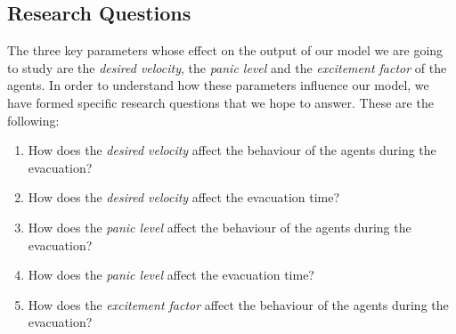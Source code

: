 \subsection{Research Questions}
The three key parameters whose effect on the output of our model we are going to study are the \emph{desired velocity}, the \emph{panic level} and the \emph{excitement factor} of the agents. In order to understand how these parameters influence our model, we have formed specific research questions that we hope to answer. These are the following:
\begin{enumerate}
	\item How does the \emph{desired velocity} affect the behaviour of the agents during the evacuation?
	
	\item How does the \emph{desired velocity} affect the evacuation time?
	
	\item How does the \emph{panic level} affect the behaviour of the agents during the evacuation?
	
	\item How does the \emph{panic level} affect the evacuation time?
	
	\item How does the \emph{excitement factor} affect the behaviour of the agents during the evacuation?
\end{enumerate}
